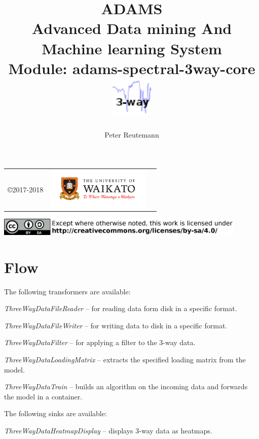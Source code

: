 \documentclass[a4paper]{book}
\title{
  \textbf{ADAMS} \\
  {\Large \textbf{A}dvanced \textbf{D}ata mining \textbf{A}nd \textbf{M}achine
  learning \textbf{S}ystem} \\
  {\Large Module: adams-spectral-3way-core} \\
  \vspace{1cm}
  \includegraphics[width=2cm]{images/spectral-3way-core-module.png} \\
}
\author{
  Peter Reutemann
}
\begin{document}
\begin{titlepage}
\maketitle

\thispagestyle{empty}
\center
\begin{table}[b]
	\begin{tabular}{c l l}
		\parbox[c][2cm]{2cm}{\copyright 2017-2018} &
		\parbox[c][2cm]{5cm}{\includegraphics[width=5cm]{images/coat_of_arms.pdf}} \\
	\end{tabular}
	\includegraphics[width=12cm]{images/cc.png} \\
\end{table}

\end{titlepage}

\tableofcontents

\chapter{Flow}
The following transformers are available:
\begin{tight_itemize}
  \item \textit{ThreeWayDataFileReader} -- for reading data form disk in a
  specific format.
  \item \textit{ThreeWayDataFileWriter} -- for writing data to disk in a
  specific format.
  \item \textit{ThreeWayDataFilter} -- for applying a filter to the 3-way data.
  \item \textit{ThreeWayDataLoadingMatrix} -- extracts the specified loading matrix
  from the model.
  \item \textit{ThreeWayDataTrain} -- builds an algorithm on the incoming data
  and forwards the model in a container.
\end{tight_itemize}

\noindent The following sinks are available:
\begin{tight_itemize}
  \item \textit{ThreeWayDataHeatmapDisplay} -- displays 3-way data as heatmaps.
\end{tight_itemize}
\end{document}
